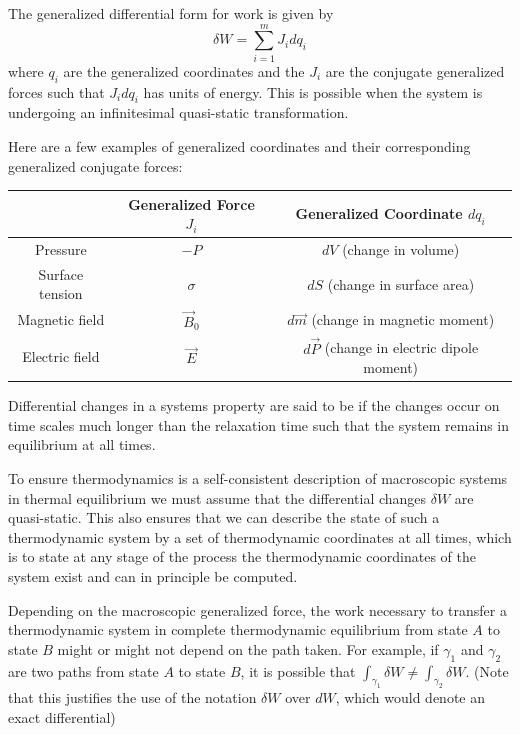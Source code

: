 \documentclass[12pt, a4paper, oneside, openright, titlepage]{book}
\begin{document}
\begin{defn}
    The generalized differential form for work is given by \begin{equation}
        \delta W = \sum_{i=1}^mJ_idq_i
    \end{equation}
    where $q_i$ are the generalized coordinates and the $J_i$ are the conjugate generalized forces such that $J_idq_i$ has units of energy. This is possible when the system is undergoing an infinitesimal quasi-static transformation.
\end{defn}

Here are a few examples of generalized coordinates and their corresponding generalized conjugate forces:

\begin{table}[H]
    \centering
    \begin{tabular}{c|c|c}
        \hline
        & Generalized Force $J_i$ & Generalized Coordinate $dq_i$ \\ \hline \hline
        Pressure & $-P$ & $dV$ (change in volume) \\ 
        Surface tension & $\sigma$ & $dS$ (change in surface area) \\
        Magnetic field & $\vec{B}_0$ & $d\vec{m}$ (change in magnetic moment) \\
        Electric field & $\vec{E}$ & $d\vec{P}$ (change in electric dipole moment) \\\hline
    \end{tabular}
\end{table}

\begin{defn}
    Differential changes in a systems property are said to be  if the changes occur on time scales much longer than the relaxation time such that the system remains in equilibrium at all times.
\end{defn}

To ensure thermodynamics is a self-consistent description of macroscopic systems in thermal equilibrium we must assume that the differential changes $\delta W$ are quasi-static. This also ensures that we can describe the state of such a thermodynamic system by a set of thermodynamic coordinates at all times, which is to state at any stage of the process the thermodynamic coordinates of the system exist and can in principle be computed. 

Depending on the macroscopic generalized force, the work necessary to transfer a thermodynamic system in complete thermodynamic equilibrium from state $A$ to state $B$ might or might not depend on the path taken. For example, if $\gamma_1$ and $\gamma_2$ are two paths from state $A$ to state $B$, it is possible that $\int_{\gamma_1}\delta W \neq \int_{\gamma_2}\delta W$. (Note that this justifies the use of the notation $\delta W$ over $dW$, which would denote an exact differential)
\end{document}
